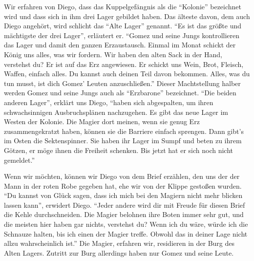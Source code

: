\documentclass[a5paper,pagesize,numbers=noenddot]{scrbook}
\begin{document}
Wir erfahren von Diego, dass das Kuppelgefängnis als die \enquote{Kolonie} bezeichnet wird und dass sich in ihm drei Lager gebildet haben.
Das älteste davon, dem auch Diego angehört, wird schlicht das \enquote{Alte Lager} genannt.
\enquote{Es ist das größte und mächtigste der drei Lager}, erläutert er.
\enquote{Gomez und seine Jungs kontrollieren das Lager und damit den ganzen Erzaustausch.
Einmal im Monat schickt der König uns alles, was wir fordern.
Wir haben den alten Sack in der Hand, verstehst du?
Er ist auf das Erz angewiesen.
Er schickt uns Wein, Brot, Fleisch, Waffen, einfach alles.
Du kannst auch deinen Teil davon bekommen.
Alles, was du tun musst, ist dich Gomez' Leuten anzuschließen.}
Dieser Machtstellung halber werden Gomez und seine Jungs auch als \enquote{Erzbarone} bezeichnet.
\enquote{Die beiden anderen Lager}, erklärt uns Diego, \enquote{haben sich abgespalten, um ihren schwachsinnigen Ausbruchsplänen nachzugehen.
Es gibt das neue Lager im Westen der Kolonie.
Die Magier dort meinen, wenn sie genug Erz zusammengekratzt haben, können sie die Barriere einfach sprengen.
Dann gibt's im Osten die Sektenspinner.
Sie haben ihr Lager im Sumpf und beten zu ihrem Götzen, er möge ihnen die Freiheit schenken.
Bis jetzt hat er sich noch nicht gemeldet.}

Wenn wir möchten, können wir Diego von dem Brief erzählen, den uns der der Mann in der roten Robe gegeben hat, ehe wir von der Klippe gestoßen wurden.
\enquote{Du kannst von Glück sagen, dass ich mich bei den Magiern nicht mehr blicken lassen kann}, erwidert Diego.
\enquote{Jeder andere wird dir mit Freude für diesen Brief die Kehle durchschneiden.
Die Magier belohnen ihre Boten immer sehr gut, und die meisten hier haben gar nichts, verstehst du?
Wenn ich du wäre, würde ich die Schnauze halten, bis ich einen der Magier treffe.
Obwohl das in deiner Lage nicht allzu wahrscheinlich ist.}
Die Magier, erfahren wir, residieren in der Burg des Alten Lagers.
Zutritt zur Burg allerdings haben nur Gomez und seine Leute.
\end{document}
